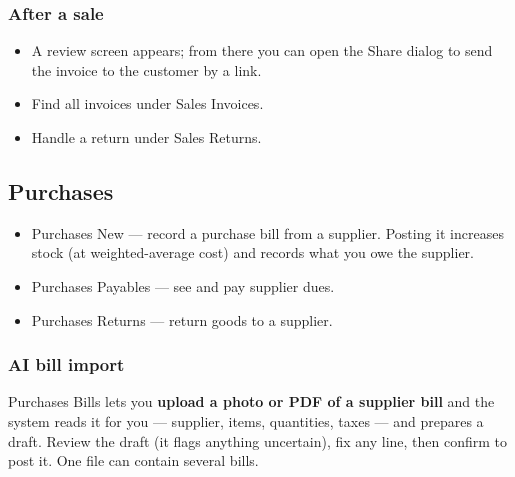 \documentclass[11pt,a4paper]{article}
\newcommand{\menu}[1]{\textsf{#1}}
\begin{document}
\subsubsection{After a sale}
\begin{itemize}
  \item A review screen appears; from there you can open the \menu{Share} dialog
        to send the invoice to the customer by a link.
  \item Find all invoices under \menu{Sales \textrightarrow{} Invoices}.
  \item Handle a return under \menu{Sales \textrightarrow{} Returns}.
\end{itemize}

\subsection{Purchases}
\begin{itemize}
  \item \menu{Purchases \textrightarrow{} New} --- record a purchase bill from a
        supplier. Posting it increases stock (at weighted-average cost) and
        records what you owe the supplier.
  \item \menu{Purchases \textrightarrow{} Payables} --- see and pay supplier dues.
  \item \menu{Purchases \textrightarrow{} Returns} --- return goods to a supplier.
\end{itemize}

\subsubsection{AI bill import}
\menu{Purchases \textrightarrow{} Bills} lets you \textbf{upload a photo or PDF of
a supplier bill} and the system reads it for you --- supplier, items, quantities,
taxes --- and prepares a draft. Review the draft (it flags anything uncertain),
fix any line, then confirm to post it. One file can contain several bills.
\end{document}
